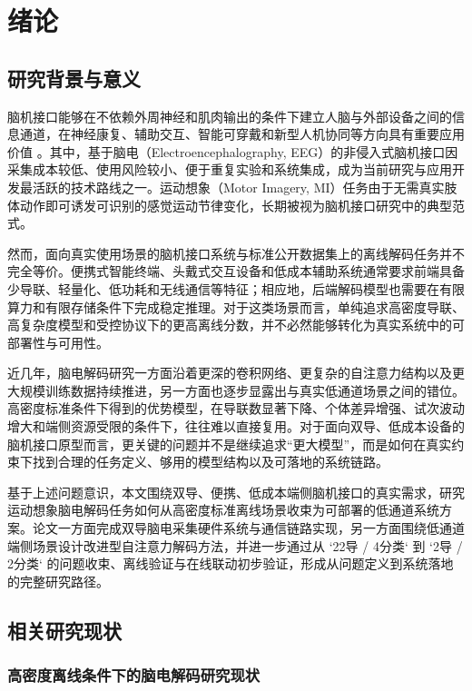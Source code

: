 \chapter{绪论}
\label{cha:intro}

\section{研究背景与意义}

\noindent
脑机接口能够在不依赖外周神经和肌肉输出的条件下建立人脑与外部设备之间的信息通道，在神经康复、辅助交互、智能可穿戴和新型人机协同等方向具有重要应用价值 \cite{lotte2018review}。其中，基于脑电（Electroencephalography, EEG）的非侵入式脑机接口因采集成本较低、使用风险较小、便于重复实验和系统集成，成为当前研究与应用开发最活跃的技术路线之一。运动想象（Motor Imagery, MI）任务由于无需真实肢体动作即可诱发可识别的感觉运动节律变化，长期被视为脑机接口研究中的典型范式。

\noindent
然而，面向真实使用场景的脑机接口系统与标准公开数据集上的离线解码任务并不完全等价。便携式智能终端、头戴式交互设备和低成本辅助系统通常要求前端具备少导联、轻量化、低功耗和无线通信等特征；相应地，后端解码模型也需要在有限算力和有限存储条件下完成稳定推理。对于这类场景而言，单纯追求高密度导联、高复杂度模型和受控协议下的更高离线分数，并不必然能够转化为真实系统中的可部署性与可用性。

\noindent
近几年，脑电解码研究一方面沿着更深的卷积网络、更复杂的自注意力结构以及更大规模训练数据持续推进，另一方面也逐步显露出与真实低通道场景之间的错位。高密度标准条件下得到的优势模型，在导联数显著下降、个体差异增强、试次波动增大和端侧资源受限的条件下，往往难以直接复用。对于面向双导、低成本设备的脑机接口原型而言，更关键的问题并不是继续追求“更大模型”，而是如何在真实约束下找到合理的任务定义、够用的模型结构以及可落地的系统链路。

\noindent
基于上述问题意识，本文围绕双导、便携、低成本端侧脑机接口的真实需求，研究运动想象脑电解码任务如何从高密度标准离线场景收束为可部署的低通道系统方案。论文一方面完成双导脑电采集硬件系统与通信链路实现，另一方面围绕低通道端侧场景设计改进型自注意力解码方法，并进一步通过从 `22导 / 4分类` 到 `2导 / 2分类` 的问题收束、离线验证与在线联动初步验证，形成从问题定义到系统落地的完整研究路径。

\section{相关研究现状}
\subsection{高密度离线条件下的脑电解码研究现状}


